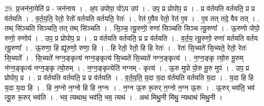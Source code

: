 \documentclass[17pt]{extarticle}
\begin{document}
29. प्र॒जन॑ना॒येति॑ प्र - जन॑नाय । . अ॒प उपोपा॒ पो॑ऽप उप॑ । . उप॒ प्र प्रोपोप॒ प्र । . प्र व॑र्तयति वर्तयति॒ प्र प्र व॑र्तयति । . व॒र्त॒य॒ति॒ रेतो॒ रेतो॑ वर्तयति वर्तयति॒ रेतः॑ । . रेत॑ ए॒वैव रेतो॒ रेत॑ ए॒व । . ए॒व तत् तदे॒ वैव तत् । . तथ् सि॑ञ्चति सिञ्चति॒ तत् तथ् सि॑ञ्चति । . सि॒ञ्च॒ त्यू॒रुणो॒ रुणा॑ सिञ्चति सिञ्च त्यू॒रुणा᳚ । . ऊ॒रुणो पोपो॒ रुणो॒ रुणोप॑ । . उप॒ प्र प्रोपोप॒ प्र । . प्र व॑र्तयति वर्तयति॒ प्र प्र व॑र्तयति । . व॒र्त॒य॒ त्यू॒रुणो॒ रुणा॑ वर्तयति वर्तय त्यू॒रुणा᳚ । . ऊ॒रुणा॒ हि ह्यू॑रुणो॒ रुणा॒ हि । . हि रेतो॒ रेतो॒ हि हि रेतः॑ । . रेतः॑ सि॒च्यते॑ सि॒च्यते॒ रेतो॒ रेतः॑ सि॒च्यते᳚ । . सि॒च्यते॑ नग्न॒ङ्कृत्य॑ नग्न॒ङ्कृत्य॑ सि॒च्यते॑ सि॒च्यते॑ नग्न॒ङ्कृत्य॑ । . न॒ग्न॒ङ्कृ त्यो॒रु मू॒रुम् न॑ग्न॒ङ्कृत्य॑ नग्न॒ङ्कृ त्यो॒रुम् । . न॒ग्न॒ङ्कृत्येति॑ नग्नम् - कृत्य॑ । . ऊ॒रु मुपो पो॒रु मू॒रु मुप॑ । . उप॒ प्र प्रोपोप॒ प्र । . प्र व॑र्तयति वर्तयति॒ प्र प्र व॑र्तयति । . व॒र्त॒य॒ति॒ य॒दा य॒दा व॑र्तयति वर्तयति य॒दा । . य॒दा हि हि य॒दा य॒दा हि । . हि न॒ग्नो न॒ग्नो हि हि न॒ग्नः । . न॒ग्न ऊ॒रु रू॒रुर् न॒ग्नो न॒ग्न ऊ॒रुः । . ऊ॒रुर् भव॑ति॒ भव॑ त्यू॒रु रू॒रुर् भव॑ति । . भव॒ त्यथाथ॒ भव॑ति॒ भव॒ त्यथ॑ । . अथ॑ मिथु॒नी मि॑थु॒ न्यथाथ॑ मिथु॒नी । \newline
\end{document}
